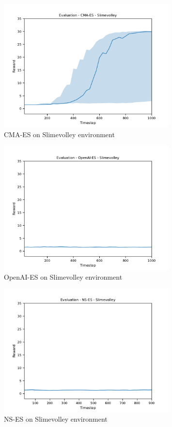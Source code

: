 \begin{figure}[H]
    \includegraphics[width=0.8\textwidth]{img/eval-slime-cmaes.pdf}
    \caption{CMA-ES on Slimevolley environment}
    \label{fig:slime-cma}

\end{figure}
\begin{figure}[H]
    \includegraphics[width=0.8\textwidth]{img/eval-slime-open.pdf}
    \caption{OpenAI-ES on Slimevolley environment}
    \label{fig:slime-open}

\end{figure}
\begin{figure}[H]
    \includegraphics[width=0.8\textwidth]{img/eval-slime-nses.pdf}
    \caption{NS-ES on Slimevolley environment}
    \label{fig:slime-ns}

\end{figure}
